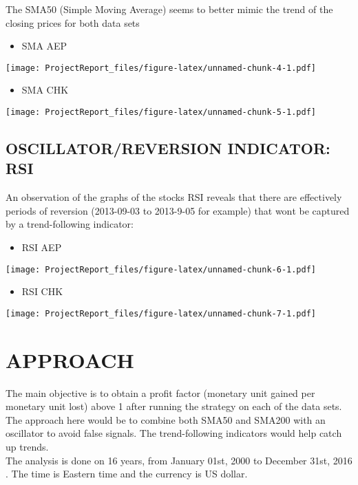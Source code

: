 \documentclass[12pt,]{article}
\providecommand{\tightlist}{%
  \setlength{\itemsep}{0pt}\setlength{\parskip}{0pt}}
\begin{document}
The SMA50 (Simple Moving Average) seems to better mimic the trend of the
closing prices for both data sets

\begin{itemize}
\tightlist
\item
  SMA AEP
\end{itemize}

\texttt{[image: ProjectReport\_files/figure-latex/unnamed-chunk-4-1.pdf]}

\begin{itemize}
\tightlist
\item
  SMA CHK
\end{itemize}

\texttt{[image: ProjectReport\_files/figure-latex/unnamed-chunk-5-1.pdf]}

\subsection{OSCILLATOR/REVERSION INDICATOR:
RSI}\label{oscillatorreversion-indicator-rsi}

An observation of the graphs of the stocks RSI reveals that there are
effectively periods of reversion (2013-09-03 to 2013-9-05 for example)
that wont be captured by a trend-following indicator:

\begin{itemize}
\tightlist
\item
  RSI AEP
\end{itemize}

\texttt{[image: ProjectReport\_files/figure-latex/unnamed-chunk-6-1.pdf]}

\begin{itemize}
\tightlist
\item
  RSI CHK
\end{itemize}

\texttt{[image: ProjectReport\_files/figure-latex/unnamed-chunk-7-1.pdf]}

\section{APPROACH}\label{approach}

The main objective is to obtain a profit factor (monetary unit gained
per monetary unit lost) above 1 after running the strategy on each of
the data sets. The approach here would be to combine both SMA50 and
SMA200 with an oscillator to avoid false signals. The trend-following
indicators would help catch up trends.\\
The analysis is done on 16 years, from January 01st, 2000 to December
31st, 2016 . The time is Eastern time and the currency is US dollar.
\end{document}

